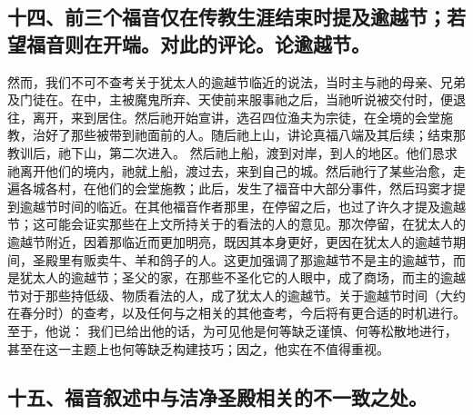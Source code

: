 
\subsection{十四、前三个福音仅在传教生涯结束时提及逾越节；若望福音则在开端。对此的评论。论逾越节。}

然而，我们不可不查考关于犹太人的逾越节临近的说法，当时主与祂的母亲、兄弟及门徒在。在中，主被魔鬼所弃、天使前来服事祂之后，当祂听说被交付时，便退往，离开，来到居住。然后祂开始宣讲，选召四位渔夫为宗徒，在全境的会堂施教，治好了那些被带到祂面前的人。随后祂上山，讲论真福八端及其后续；结束那教训后，祂下山，第二次进入。 然后祂上船，渡到对岸，到人的地区。他们恳求祂离开他们的境内，祂就上船，渡过去，来到自己的城。然后祂行了某些治愈，走遍各城各村，在他们的会堂施教；此后，发生了福音中大部分事件，然后玛窦才提到逾越节时间的临近。在其他福音作者那里，在停留之后，也过了许久才提及逾越节；这可能会证实那些在上文所持关于的看法的人的意见。那次停留，在犹太人的逾越节附近，因着那临近而更加明亮，既因其本身更好，更因在犹太人的逾越节期间，圣殿里有贩卖牛、羊和鸽子的人。这更加强调了那逾越节不是主的逾越节，而是犹太人的逾越节；圣父的家，在那些不圣化它的人眼中，成了商场，而主的逾越节对于那些持低级、物质看法的人，成了犹太人的逾越节。关于逾越节时间（大约在春分时）的查考，以及任何与之相关的其他查考，今后将有更合适的时机进行。至于，他说： 我们已给出他的话，为可见他是何等缺乏谨慎、何等松散地进行，甚至在这一主题上也何等缺乏构建技巧；因之，他实在不值得重视。\par


\subsection{十五、福音叙述中与洁净圣殿相关的不一致之处。}

